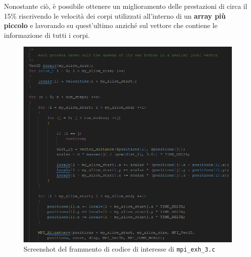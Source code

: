 \documentclass[12pt]{report}
\begin{document}
    \newpage
    
    Nonostante ciò, è possibile ottenere un miglioramento delle prestazioni di circa il 15\% riscrivendo le velocità dei corpi utilizzati all'interno di un \textbf{array più piccolo} e lavorando su quest'ultimo anziché sul vettore che contiene le informazione di tutti i corpi. 

    \begin{figure}[H]
        \centering
        \includegraphics[width=\textwidth]{images/mpi_exh_3.png}
        \caption{Screenshot del frammento di codice di interesse di \texttt{mpi\_exh\_3.c}}
        \label{fig:mpi_exh_3}
    \end{figure}
\end{document}
